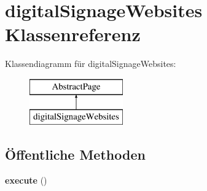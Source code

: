 \hypertarget{classdigital_signage_websites}{}\section{digital\+Signage\+Websites Klassenreferenz}
\label{classdigital_signage_websites}
Klassendiagramm für digital\+Signage\+Websites\+:\begin{figure}[H]
\begin{center}
\leavevmode
\includegraphics[height=2.000000cm]{classdigital_signage_websites}
\end{center}
\end{figure}
\subsection*{Öffentliche Methoden}
\begin{DoxyCompactItemize}
\item 
\mbox{\label{classdigital_signage_websites_abc95b129c6e605fcec72a764051b13d8}} 
{\bfseries execute} ()
\end{DoxyCompactItemize}
